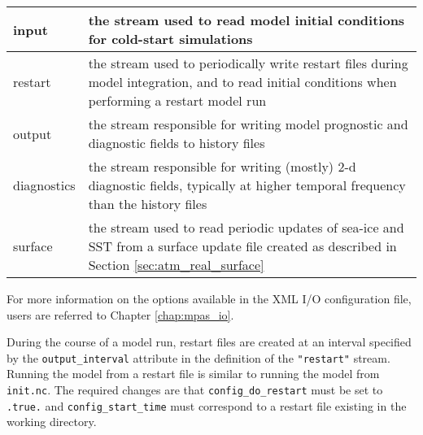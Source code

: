 \begin{longtable}{|p{1.25in} |p{5.0in}|}
\hline
   input        & the stream used to read model initial conditions for cold-start simulations \\ \hline
   restart      & the stream used to periodically write restart files during model integration, and to read initial conditions when performing a restart model run \\ \hline
   output      & the stream responsible for writing model prognostic and diagnostic fields to history files \\ \hline
   diagnostics & the stream responsible for writing (mostly) 2-d diagnostic fields, typically at higher temporal frequency than the history files \\ \hline
   surface    & the stream used to read periodic updates of sea-ice and SST from a surface update file created as described in Section 
\ref{sec:atm_real_surface} \\ \hline
\end{longtable}

\noindent For more information on the options available in the XML I/O configuration file, users are referred to Chapter \ref{chap:mpas_io}.

During the course of a model run, restart files are created at an interval specified by the {\tt output\_interval} attribute in the definition of the {\tt "restart"} stream. Running the model from a restart file is similar to running the model from {\tt init.nc}.  The required changes are that {\tt config\_do\_restart} must be set to {\tt .true.} and {\tt config\_start\_time} must correspond to a restart file existing in the working directory.

